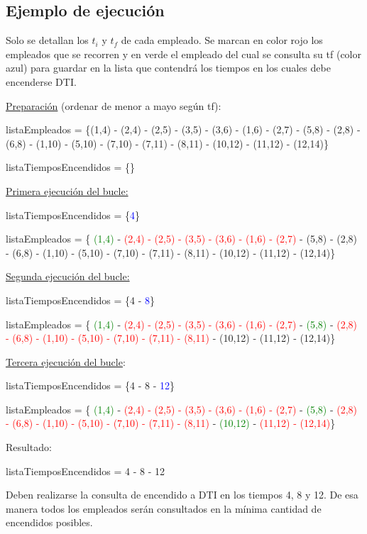 \documentclass{article}
\begin{document}
\subsection{Ejemplo de ejecución}

Solo se detallan los \(t_i\) y \(t_f\) de cada empleado. 
Se marcan en color rojo los empleados que se recorren y en verde el empleado del cual 
se consulta su tf (color azul) para guardar en la lista que contendrá los tiempos en los 
cuales debe encenderse DTI.


\underline{Preparación} (ordenar de menor a mayo según tf):

listaEmpleados = \{(1,4) - (2,4) - (2,5) - (3,5) - (3,6) - (1,6) - (2,7) - (5,8) - (2,8) - (6,8) - (1,10) - (5,10) - (7,10) - (7,11) - (8,11) - (10,12) - (11,12) - (12,14)\}

listaTiemposEncendidos = \{\}


\underline{Primera ejecución del bucle:}

listaTiemposEncendidos = \{\textcolor{blue}{4}\}

listaEmpleados = \{ \textcolor{green}{(1,4)} - \textcolor{red}{(2,4) - (2,5) - (3,5) - (3,6) - (1,6) - (2,7)} - (5,8) - (2,8) - (6,8) - (1,10) - (5,10) - (7,10) - (7,11) - (8,11) - (10,12) - (11,12) - (12,14)\}

\underline{Segunda ejecución del bucle:}

listaTiemposEncendidos = \{4 - \textcolor{blue}{8}\}

listaEmpleados = \{ \textcolor{green}{(1,4)} - \textcolor{red}{(2,4) - (2,5) - (3,5) - (3,6) - (1,6) - (2,7)} - \textcolor{green}{(5,8)} - \textcolor{red}{(2,8) - (6,8) - (1,10) - (5,10) - (7,10) - (7,11) - (8,11)} - (10,12) - (11,12) - (12,14)\}

\underline{Tercera ejecución del bucle}:

listaTiemposEncendidos = \{4 - 8 - \textcolor{blue}{12}\}

listaEmpleados = \{ \textcolor{green}{(1,4)} - \textcolor{red}{(2,4) - (2,5) - (3,5) - (3,6) - (1,6) - (2,7)} - \textcolor{green}{(5,8)} - \textcolor{red}{(2,8) - (6,8) - (1,10) - (5,10) - (7,10) - (7,11) - (8,11)} - \textcolor{green}{(10,12)} - \textcolor{red}{(11,12) - (12,14)}\}


Resultado:

listaTiemposEncendidos = {4 - 8 - 12}


Deben realizarse la consulta de encendido a DTI en los tiempos 4, 8 y 12. De esa manera todos los empleados serán consultados en la mínima cantidad de encendidos posibles.
\end{document}
